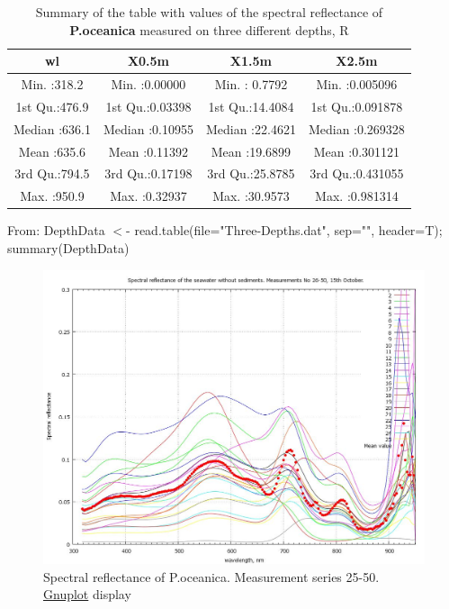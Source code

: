 \documentclass[10pt, a4paper]{article}
\begin{document}
\begin{appendices}
\begin{table}[H]
\end{table}
\pagebreak

\begin{table}[htbp]
	\caption{Summary of the table with values of the spectral reflectance of \textbf{P.oceanica} measured on three different depths, R}
	\begin{center}
	\begin{tabular}{|c|c|c|c|}
		\hline\hline
		wl & X0.5m & X1.5m & X2.5m\\ \hline\hline
		Min.   :318.2   &  Min.   :0.00000     &   Min.   : 0.7792     &   Min.   :0.005096  \\ \hline
		 1st Qu.:476.9   &  1st Qu.:0.03398    &  1st Qu.:14.4084    &  1st Qu.:0.091878  \\ \hline
		 Median :636.1   &   Median :0.10955    &  Median :22.4621   &  Median :0.269328 \\ \hline 
		 Mean   :635.6   &   Mean   :0.11392   &   Mean   :19.6899   &  Mean   :0.301121  \\ \hline
		 3rd Qu.:794.5   &   3rd Qu.:0.17198   &   3rd Qu.:25.8785    &  3rd Qu.:0.431055 \\ \hline  
		 Max.   :950.9     &  Max.   :0.32937    &  Max.   :30.9573   &   Max.   :0.981314  \\ \hline
	\end{tabular}
	\end{center}
		From: DepthData $<$- read.table(file="Three-Depths.dat", sep="", header=T); summary(DepthData)
	\label{tab:17}
\end{table}

\begin{figure}[H]
	\begin{center}
		\includegraphics[scale=0.25]{GNU-11.jpg}
		\caption{Spectral reflectance of P.oceanica. Measurement series 25-50. \\ \href{http://www.gnuplot.info/}{Gnuplot} display­}
		\label{fig:A.25}
	\end{center}
\end{figure}
\pagebreak


\end{appendices}
\end{document}
